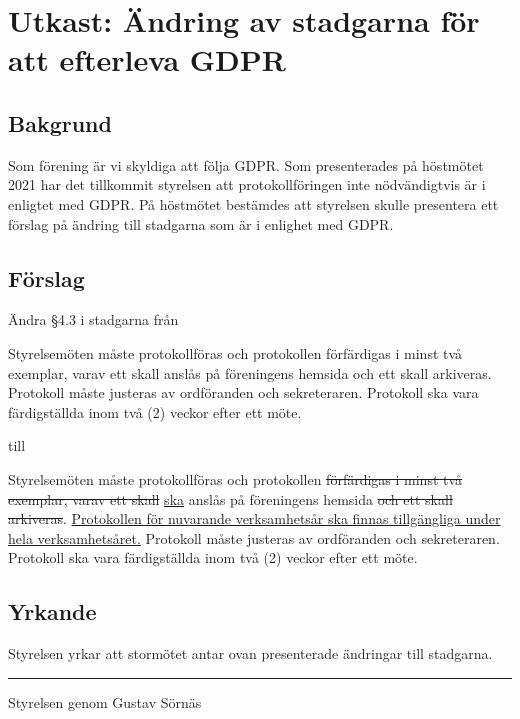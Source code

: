 \documentclass[12pt,a4paper]{article}
\newenvironment{quotationb}%
{\begin{leftbar}}%
{\end{leftbar}}
\newcommand{\thedate}{2022--04--21}
\begin{document}
\pagestyle{fancy}
\rhead{Proposition\\Linköping \thedate\\\phantom{}}

\hspace{20em}

\section{Utkast: Ändring av stadgarna för att efterleva GDPR}

\subsection{Bakgrund}

Som förening är vi skyldiga att följa GDPR. Som presenterades på höstmötet 2021
har det tillkommit styrelsen att protokollföringen inte nödvändigtvis är i
enligtet med GDPR. På höstmötet bestämdes att styrelsen skulle presentera ett
förslag på ändring till stadgarna som är i enlighet med GDPR.

\subsection{Förslag}

Ändra \S4.3 i stadgarna från

\begin{quotationb}

Styrelsemöten måste protokollföras och protokollen förfärdigas i minst två
    exemplar, varav ett skall anslås på föreningens hemsida och ett skall
    arkiveras. Protokoll måste justeras av ordföranden och sekreteraren.
    Protokoll ska vara färdigställda inom två (2) veckor efter ett möte.

\end{quotationb}

till

\begin{quotationb}

Styrelsemöten måste protokollföras och protokollen \sout{förfärdigas i minst två
    exemplar, varav ett skall} \underline{ska} anslås på föreningens hemsida
    \sout{och ett skall arkiveras}. \underline{Protokollen för nuvarande
    verksamhetsår ska finnas tillgängliga under hela verksamhetsåret.} Protokoll
    måste justeras av ordföranden och sekreteraren. Protokoll ska vara
    färdigställda inom två (2) veckor efter ett möte.

\end{quotationb}


\subsection{Yrkande}

Styrelsen yrkar att stormötet antar ovan presenterade ändringar till stadgarna.

\rule{\linewidth}{1pt}

Styrelsen genom Gustav Sörnäs
\end{document}

